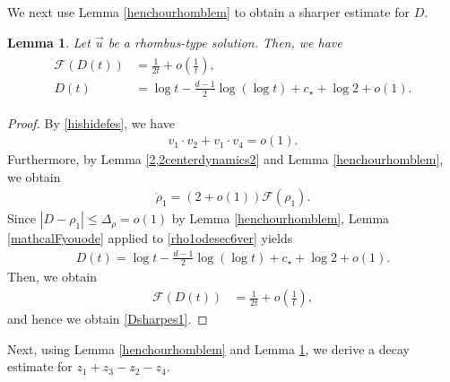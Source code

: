 \documentclass[reqno]{amsart}
\theoremstyle{plain}
\newtheorem{lemma}[theorem]{Lemma}
\theoremstyle{definition}
\numberwithin{equation}{section}
\begin{document}
We next use Lemma \ref{henchourhomblem} to obtain a sharper estimate for $D$.

\begin{lemma}\label{Dsharprhomblem}
Let $\vec{u}$ be a rhombus-type solution. Then, we have
\begin{align}\label{Dsharpes1}
\begin{aligned}
\mathcal{F}(D(t))&=\frac{1}{2t}+o\left(\frac{1}{t}\right),
\\
D(t)&=\log{t}-\frac{d-1}{2}\log{(\log{t})}+c_{\star}+\log{2}+o(1).
\end{aligned}
\end{align}
\end{lemma}
\begin{proof}
By \eqref{hishidefes}, we have
\begin{align*}
v_1\cdot v_2+v_1\cdot v_4=o(1).
\end{align*}
Furthermore, by Lemma \ref{2,2centerdynamics2} and Lemma \ref{henchourhomblem}, we obtain
\begin{align}\label{rho1odesec6ver}
\dot{\rho}_1=\left(2+o(1)\right)\mathcal{F}(\rho_1).
\end{align}
Since $|D-\rho_1|\leq\Delta_\rho=o(1)$ by Lemma \ref{henchourhomblem}, Lemma \ref{mathcalFyouode} applied to \eqref{rho1odesec6ver} yields
\begin{align*}
D(t)=\log{t}-\frac{d-1}{2}\log{(\log{t})}+c_{\star}+\log{2}+o(1).
\end{align*}
Then, we obtain 
\begin{align*}
\mathcal{F}(D(t))&=\frac{1}{2t}+o\left(\frac{1}{t}\right),
\end{align*}
and hence we obtain \eqref{Dsharpes1}.
\end{proof}

Next, using Lemma \ref{henchourhomblem} and Lemma \ref{Dsharprhomblem}, we derive a decay estimate for $z_1+z_3-z_2-z_4$.
\end{document}

